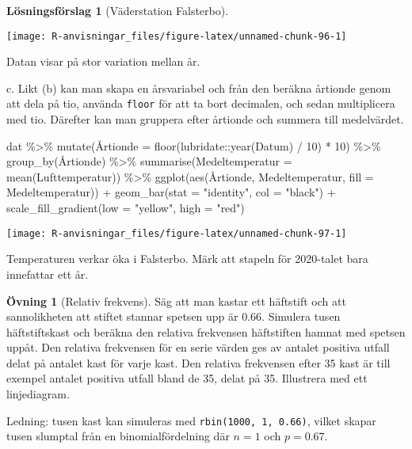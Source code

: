\documentclass[
]{book}
\newenvironment{Shaded}{\begin{snugshade}}{\end{snugshade}}
\newcommand{\AttributeTok}[1]{\textcolor[rgb]{0.77,0.63,0.00}{#1}}
\newcommand{\DecValTok}[1]{\textcolor[rgb]{0.00,0.00,0.81}{#1}}
\newcommand{\FunctionTok}[1]{\textcolor[rgb]{0.00,0.00,0.00}{#1}}
\newcommand{\NormalTok}[1]{#1}
\newcommand{\SpecialCharTok}[1]{\textcolor[rgb]{0.00,0.00,0.00}{#1}}
\newcommand{\StringTok}[1]{\textcolor[rgb]{0.31,0.60,0.02}{#1}}
\theoremstyle{definition}
\theoremstyle{definition}
\theoremstyle{definition}
\newtheorem{exercise}{Övning}[chapter]
\theoremstyle{definition}
\newtheorem{hypothesis}{Lösningsförslag}[chapter]
\theoremstyle{remark}
\begin{document}
\begin{hypothesis}[Väderstation Falsterbo]
\begin{center}\texttt{[image: R-anvisningar\_files/figure-latex/unnamed-chunk-96-1]} \end{center}

Datan visar på stor variation mellan år.

c. Likt (b) kan man skapa en årsvariabel och från den beräkna årtionde genom att dela på tio, använda \texttt{floor} för att ta bort decimalen, och sedan multiplicera med tio. Därefter kan man gruppera efter årtionde och summera till medelvärdet.

\begin{Shaded}
\begin{Highlighting}[]
\NormalTok{dat }\SpecialCharTok{\%\textgreater{}\%} 
  \FunctionTok{mutate}\NormalTok{(Å}\AttributeTok{rtionde =} \FunctionTok{floor}\NormalTok{(lubridate}\SpecialCharTok{::}\FunctionTok{year}\NormalTok{(Datum) }\SpecialCharTok{/} \DecValTok{10}\NormalTok{) }\SpecialCharTok{*} \DecValTok{10}\NormalTok{) }\SpecialCharTok{\%\textgreater{}\%} 
  \FunctionTok{group\_by}\NormalTok{(Årtionde) }\SpecialCharTok{\%\textgreater{}\%} 
  \FunctionTok{summarise}\NormalTok{(}\AttributeTok{Medeltemperatur =} \FunctionTok{mean}\NormalTok{(Lufttemperatur)) }\SpecialCharTok{\%\textgreater{}\%} 
  \FunctionTok{ggplot}\NormalTok{(}\FunctionTok{aes}\NormalTok{(Årtionde, Medeltemperatur, }\AttributeTok{fill =}\NormalTok{ Medeltemperatur)) }\SpecialCharTok{+}
  \FunctionTok{geom\_bar}\NormalTok{(}\AttributeTok{stat =} \StringTok{"identity"}\NormalTok{, }\AttributeTok{col =} \StringTok{"black"}\NormalTok{) }\SpecialCharTok{+}
  \FunctionTok{scale\_fill\_gradient}\NormalTok{(}\AttributeTok{low =} \StringTok{"yellow"}\NormalTok{, }\AttributeTok{high =} \StringTok{"red"}\NormalTok{)}
\end{Highlighting}
\end{Shaded}

\begin{center}\texttt{[image: R-anvisningar\_files/figure-latex/unnamed-chunk-97-1]} \end{center}

Temperaturen verkar öka i Falsterbo. Märk att stapeln för 2020-talet bara innefattar ett år.
\end{hypothesis}

\begin{exercise}[Relativ frekvens]
Säg att man kastar ett häftstift och att sannolikheten att stiftet stannar spetsen upp är 0.66. Simulera tusen häftstiftskast och beräkna den relativa frekvensen häftstiften hamnat med spetsen uppåt. Den relativa frekvensen för en serie värden ges av antalet positiva utfall delat på antalet kast för varje kast. Den relativa frekvensen efter 35 kast är till exempel antalet positiva utfall bland de 35, delat på 35.
Illustrera med ett linjediagram.

Ledning: tusen kast kan simuleras med \texttt{rbin(1000,\ 1,\ 0.66)}, vilket skapar tusen slumptal från en binomialfördelning där \(n = 1\) och \(p = 0.67\).
\end{exercise}
\end{document}
